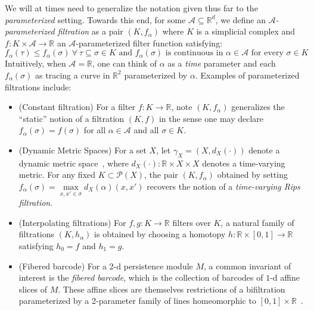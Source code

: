 \documentclass[pdflatex,sn-mathphys-num]{sn-jnl}
\begin{document}
We will at times need to generalize the notation given thus far to the \emph{parameterized} setting. Towards this end, for some \(\mathcal{A} \subseteq \mathbb{R}^{d}\), we define an \emph{\(\mathcal{A}\)-parameterized filtration} as a pair \(\left( K,f_{\alpha} \right)\) where \(K\) is a simplicial complex and \(f:K \times \mathcal{A} \rightarrow \mathbb{R}\) an \(\mathcal{A}\)-parameterized filter function satisfying:
\begin{equation*}
f_{\alpha}(\tau) \leq f_{\alpha}(\sigma)\:\forall\:\tau \subseteq \sigma \in K\text{ and }f_{\alpha}(\sigma)\text{ is continuous in }\alpha \in \mathcal{A}\text{ for every }\sigma \in K
\end{equation*}
Intuitively, when \(\mathcal{A} = \mathbb{R}\), one can think of \(\alpha\) as a \emph{time} parameter and each \(f_{\alpha}(\sigma)\) as tracing a curve in \(\mathbb{R}^{2}\) parameterized by \(\alpha\). Examples of parameterized filtrations include:
\begin{itemize}
\item
  (Constant filtration) For a filter \(f:K \rightarrow \mathbb{R}\), note \(\left( K,f_{\alpha} \right)\) generalizes the ``static'' notion of a filtration \((K,f)\) in the sense one may declare \(f_{\alpha}(\sigma) = f(\sigma)\) for all \(\alpha \in \mathcal{A}\) and all \(\sigma \in K\).
\item
  (Dynamic Metric Spaces) For a set \(X\), let \(\gamma_{X} =  \left( X,d_{X} ( \cdot )  \right) \) denote a dynamic metric space~\cite{kim2021spatiotemporal}, where \(d_{X} ( \cdot ) :\mathbb{R} \times X \times X\) denotes a time-varying metric. For any fixed \(K \subset \mathcal{P}(X)\), the pair \(\left( K,f_{\alpha} \right)\) obtained by setting \(f_{\alpha}(\sigma) = \max\limits_{x,x' \in \sigma}d_{X}(\alpha)(x,x')\) recovers the notion of a \emph{time-varying Rips filtration}.
\item
  (Interpolating filtrations) For \(f,g:K \rightarrow \mathbb{R}\) filters over \(K\), a natural family of filtrations \(\left( K,h_{\alpha} \right)\) is obtained by choosing a homotopy \(h:\mathbb{R} \times [ 0,1] \rightarrow \mathbb{R}\) satisfying \(h_{0} = f\) and \(h_{1} = g\).
\end{itemize}

\begin{itemize}
\item
  (Fibered barcode) For a 2-d persistence module \(M\), a common invariant of interest is the \emph{fibered barcode}, which is the collection of barcodes of \(1\)-d affine slices of \(M\). These affine slices are themselves restrictions of a bifiltration parameterized by a 2-parameter family of lines homeomorphic to \([ 0,1] \times \mathbb{R}\)~\cite{lesnick2015interactive}.
\end{itemize}
\end{document}

